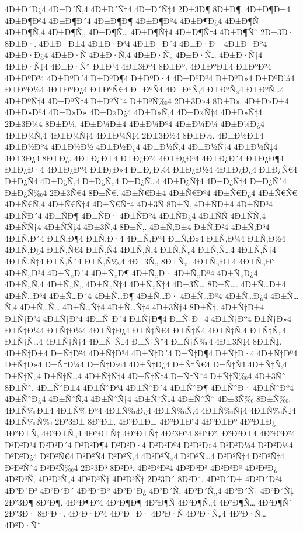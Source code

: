 {4Ð±Ð´Ð¿4
4Ð±Ð´Ñ‚4
4Ð±Ð´Ñ†4
4Ð±Ð´Ñ‡4
2Ð±3Ð¶
8Ð±Ð¶.
4Ð±Ð¶Ð±4
4Ð±Ð¶Ð³4
4Ð±Ð¶Ð´4
4Ð±Ð¶Ð¶
4Ð±Ð¶Ðº4
4Ð±Ð¶Ð¿4
4Ð±Ð¶Ñ
4Ð±Ð¶Ñ‚4
4Ð±Ð¶Ñ„
4Ð±Ð¶Ñ…
4Ð±Ð¶Ñ†4
4Ð±Ð¶Ñ‡4
4Ð±Ð¶Ñˆ
2Ð±3Ð·
8Ð±Ð·.
4Ð±Ð·Ð±4
4Ð±Ð·Ð³4
4Ð±Ð·Ð´4
4Ð±Ð·Ð·
4Ð±Ð·Ðº4
4Ð±Ð·Ð¿4
4Ð±Ð·Ñ
4Ð±Ð·Ñ‚4
4Ð±Ð·Ñ„
4Ð±Ð·Ñ…
4Ð±Ð·Ñ†4
4Ð±Ð·Ñ‡4
4Ð±Ð·Ñˆ
Ð±Ð¹4
4Ð±3Ðº4
8Ð±Ðº.
4Ð±ÐºÐ±4
Ð±ÐºÐ²4
4Ð±ÐºÐ³4
4Ð±ÐºÐ´4
Ð±ÐºÐ¶4
Ð±ÐºÐ·4
4Ð±ÐºÐº4
Ð±ÐºÐ»4
Ð±ÐºÐ¼4
Ð±ÐºÐ½4
4Ð±ÐºÐ¿4
Ð±ÐºÑ€4
Ð±ÐºÑ4
4Ð±ÐºÑ‚4
Ð±ÐºÑ„4
Ð±ÐºÑ…4
4Ð±ÐºÑ†4
4Ð±ÐºÑ‡4
Ð±ÐºÑˆ4
Ð±ÐºÑ‰4
2Ð±3Ð»4
8Ð±Ð».
4Ð±Ð»Ð±4
4Ð±Ð»Ðº4
4Ð±Ð»Ð»
4Ð±Ð»Ð¿4
4Ð±Ð»Ñ‚4
4Ð±Ð»Ñ†4
4Ð±Ð»Ñ‡4
2Ð±3Ð¼4
8Ð±Ð¼.
4Ð±Ð¼Ð±4
4Ð±Ð¼Ðº4
4Ð±Ð¼Ð¼
4Ð±Ð¼Ð¿4
4Ð±Ð¼Ñ‚4
4Ð±Ð¼Ñ†4
4Ð±Ð¼Ñ‡4
2Ð±3Ð½4
8Ð±Ð½.
4Ð±Ð½Ð±4
4Ð±Ð½Ðº4
4Ð±Ð½Ð½
4Ð±Ð½Ð¿4
4Ð±Ð½Ñ‚4
4Ð±Ð½Ñ†4
4Ð±Ð½Ñ‡4
4Ð±3Ð¿4
8Ð±Ð¿.
4Ð±Ð¿Ð±4
Ð±Ð¿Ð²4
4Ð±Ð¿Ð³4
4Ð±Ð¿Ð´4
Ð±Ð¿Ð¶4
Ð±Ð¿Ð·4
4Ð±Ð¿Ðº4
Ð±Ð¿Ð»4
Ð±Ð¿Ð¼4
Ð±Ð¿Ð½4
4Ð±Ð¿Ð¿4
Ð±Ð¿Ñ€4
Ð±Ð¿Ñ4
4Ð±Ð¿Ñ‚4
Ð±Ð¿Ñ„4
Ð±Ð¿Ñ…4
4Ð±Ð¿Ñ†4
4Ð±Ð¿Ñ‡4
Ð±Ð¿Ñˆ4
Ð±Ð¿Ñ‰4
2Ð±3Ñ€4
8Ð±Ñ€.
4Ð±Ñ€Ð±4
4Ð±Ñ€Ðº4
4Ð±Ñ€Ð¿4
4Ð±Ñ€Ñ€
4Ð±Ñ€Ñ‚4
4Ð±Ñ€Ñ†4
4Ð±Ñ€Ñ‡4
4Ð±3Ñ
8Ð±Ñ.
4Ð±ÑÐ±4
4Ð±ÑÐ³4
4Ð±ÑÐ´4
4Ð±ÑÐ¶
4Ð±ÑÐ·
4Ð±ÑÐº4
4Ð±ÑÐ¿4
4Ð±ÑÑ
4Ð±ÑÑ‚4
4Ð±ÑÑ†4
4Ð±ÑÑ‡4
4Ð±3Ñ‚4
8Ð±Ñ‚.
4Ð±Ñ‚Ð±4
Ð±Ñ‚Ð²4
4Ð±Ñ‚Ð³4
4Ð±Ñ‚Ð´4
Ð±Ñ‚Ð¶4
Ð±Ñ‚Ð·4
4Ð±Ñ‚Ðº4
Ð±Ñ‚Ð»4
Ð±Ñ‚Ð¼4
Ð±Ñ‚Ð½4
4Ð±Ñ‚Ð¿4
Ð±Ñ‚Ñ€4
Ð±Ñ‚Ñ4
4Ð±Ñ‚Ñ‚4
Ð±Ñ‚Ñ„4
Ð±Ñ‚Ñ…4
4Ð±Ñ‚Ñ†4
4Ð±Ñ‚Ñ‡4
Ð±Ñ‚Ñˆ4
Ð±Ñ‚Ñ‰4
4Ð±3Ñ„
8Ð±Ñ„.
4Ð±Ñ„Ð±4
4Ð±Ñ„Ð²
4Ð±Ñ„Ð³4
4Ð±Ñ„Ð´4
4Ð±Ñ„Ð¶
4Ð±Ñ„Ð·
4Ð±Ñ„Ðº4
4Ð±Ñ„Ð¿4
4Ð±Ñ„Ñ‚4
4Ð±Ñ„Ñ„
4Ð±Ñ„Ñ†4
4Ð±Ñ„Ñ‡4
4Ð±3Ñ…
8Ð±Ñ….
4Ð±Ñ…Ð±4
4Ð±Ñ…Ð³4
4Ð±Ñ…Ð´4
4Ð±Ñ…Ð¶
4Ð±Ñ…Ð·
4Ð±Ñ…Ðº4
4Ð±Ñ…Ð¿4
4Ð±Ñ…Ñ‚4
4Ð±Ñ…Ñ…
4Ð±Ñ…Ñ†4
4Ð±Ñ…Ñ‡4
4Ð±3Ñ†4
8Ð±Ñ†.
4Ð±Ñ†Ð±4
Ð±Ñ†Ð²4
4Ð±Ñ†Ð³4
4Ð±Ñ†Ð´4
Ð±Ñ†Ð¶4
Ð±Ñ†Ð·4
4Ð±Ñ†Ðº4
Ð±Ñ†Ð»4
Ð±Ñ†Ð¼4
Ð±Ñ†Ð½4
4Ð±Ñ†Ð¿4
Ð±Ñ†Ñ€4
Ð±Ñ†Ñ4
4Ð±Ñ†Ñ‚4
Ð±Ñ†Ñ„4
Ð±Ñ†Ñ…4
4Ð±Ñ†Ñ†4
4Ð±Ñ†Ñ‡4
Ð±Ñ†Ñˆ4
Ð±Ñ†Ñ‰4
4Ð±3Ñ‡4
8Ð±Ñ‡.
4Ð±Ñ‡Ð±4
Ð±Ñ‡Ð²4
4Ð±Ñ‡Ð³4
4Ð±Ñ‡Ð´4
Ð±Ñ‡Ð¶4
Ð±Ñ‡Ð·4
4Ð±Ñ‡Ðº4
Ð±Ñ‡Ð»4
Ð±Ñ‡Ð¼4
Ð±Ñ‡Ð½4
4Ð±Ñ‡Ð¿4
Ð±Ñ‡Ñ€4
Ð±Ñ‡Ñ4
4Ð±Ñ‡Ñ‚4
Ð±Ñ‡Ñ„4
Ð±Ñ‡Ñ…4
4Ð±Ñ‡Ñ†4
4Ð±Ñ‡Ñ‡4
Ð±Ñ‡Ñˆ4
Ð±Ñ‡Ñ‰4
4Ð±3Ñˆ
8Ð±Ñˆ.
4Ð±ÑˆÐ±4
4Ð±ÑˆÐ³4
4Ð±ÑˆÐ´4
4Ð±ÑˆÐ¶
4Ð±ÑˆÐ·
4Ð±ÑˆÐº4
4Ð±ÑˆÐ¿4
4Ð±ÑˆÑ‚4
4Ð±ÑˆÑ†4
4Ð±ÑˆÑ‡4
4Ð±ÑˆÑˆ
4Ð±3Ñ‰
8Ð±Ñ‰.
4Ð±Ñ‰Ð±4
4Ð±Ñ‰Ðº4
4Ð±Ñ‰Ð¿4
4Ð±Ñ‰Ñ‚4
4Ð±Ñ‰Ñ†4
4Ð±Ñ‰Ñ‡4
4Ð±Ñ‰Ñ‰
2Ð²3Ð±
8Ð²Ð±.
4Ð²Ð±Ð±
4Ð²Ð±Ð²4
4Ð²Ð±Ðº
4Ð²Ð±Ð¿
4Ð²Ð±Ñ‚
4Ð²Ð±Ñ„4
4Ð²Ð±Ñ†
4Ð²Ð±Ñ‡
4Ð²3Ð²4
8Ð²Ð².
Ð²Ð²Ð±4
4Ð²Ð²Ð²4
Ð²Ð²Ð³4
Ð²Ð²Ð´4
Ð²Ð²Ð¶4
Ð²Ð²Ð·4
Ð²Ð²Ðº4
Ð²Ð²Ð»4
Ð²Ð²Ð¼4
Ð²Ð²Ð½4
Ð²Ð²Ð¿4
Ð²Ð²Ñ€4
Ð²Ð²Ñ4
Ð²Ð²Ñ‚4
4Ð²Ð²Ñ„4
Ð²Ð²Ñ…4
Ð²Ð²Ñ†4
Ð²Ð²Ñ‡4
Ð²Ð²Ñˆ4
Ð²Ð²Ñ‰4
2Ð²3Ð³
8Ð²Ð³.
4Ð²Ð³Ð²4
4Ð²Ð³Ð³
4Ð²Ð³Ðº
4Ð²Ð³Ð¿
4Ð²Ð³Ñ‚
4Ð²Ð³Ñ„4
4Ð²Ð³Ñ†
4Ð²Ð³Ñ‡
2Ð²3Ð´
8Ð²Ð´.
4Ð²Ð´Ð±
4Ð²Ð´Ð²4
4Ð²Ð´Ð³
4Ð²Ð´Ð´
4Ð²Ð´Ðº
4Ð²Ð´Ð¿
4Ð²Ð´Ñ‚
4Ð²Ð´Ñ„4
4Ð²Ð´Ñ†
4Ð²Ð´Ñ‡
2Ð²3Ð¶
8Ð²Ð¶.
4Ð²Ð¶Ð²4
4Ð²Ð¶Ð¶
4Ð²Ð¶Ñ
4Ð²Ð¶Ñ„4
4Ð²Ð¶Ñ…
4Ð²Ð¶Ñˆ
2Ð²3Ð·
8Ð²Ð·.
4Ð²Ð·Ð²4
4Ð²Ð·Ð·
4Ð²Ð·Ñ
4Ð²Ð·Ñ„4
4Ð²Ð·Ñ…
4Ð²Ð·Ñˆ
}
